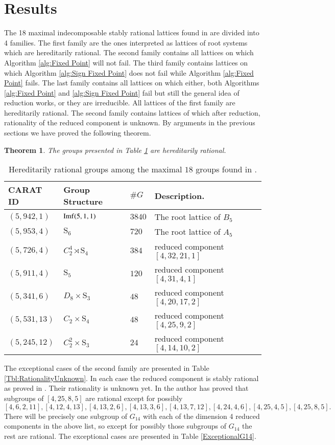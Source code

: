 \documentclass[12pt]{article}
\theoremstyle{plain}
\newtheorem{theorem}{Theorem}
\theoremstyle{definition}
\begin{document}
\section{Results}\label{sec:results}
The 18 maximal indecomposable stably rational lattices found in \cite{Hoshi} are divided into 4 families. The first family are the ones interpreted as lattices of root systems which are hereditarily rational. The second family contains all lattices on which Algorithm \ref{alg:Fixed Point} will not fail. The third family contains lattices on which  Algorithm \ref{alg:Sign Fixed Point} does not fail while Algorithm \ref{alg:Fixed Point} fails. The last family contains all lattices on which either, both Algorithms \ref{alg:Fixed Point} and \ref{alg:Sign Fixed Point} fail but still the general idea of reduction works, or they are irreducible.
All lattices of the first family are hereditarily rational. The second family contains lattices of which after reduction, rationality of the reduced component is unknown. By arguments in the previous sections we have proved the following theorem.
\begin{theorem}
The groups presented in Table \ref{Tbl:Rational} are hereditarily rational.
\end{theorem}
 \begin{table}  
\centering
\begin{tabular}{lllll}
CARAT ID & Group Structure & $\#G$ & Description.\\\hline
$(5,942,1)$ & ${\rm Imf}(5,1,1)$ & $3840$ & The root lattice of $B_5$ \\
 $(5,953,4)$ & $\mathrm{S}_6$ & $720$ &  The root lattice of $A_5$ \\
 $(5,726,4)$ & $C_2^4\rtimes \mathrm{S}_4$ & $384$   & reduced component $[4,32,21,1]$  \\
$(5,911,4)$ & $\mathrm{S}_5$ & $120$  & reduced component $[ 4, 31, 4, 1 ]$  \\
 $(5,341,6)$ & $D_8\times \mathrm{S}_3$ & $48$  & reduced component $[ 4, 20, 17, 2 ]$ &\\
 $(5,531,13)$ & $C_2\times \mathrm{S}_4$ & $48$  & reduced component $[ 4, 25, 9, 2 ]$ &\\
 $(5,245,12)$ & $C_2^2\times \mathrm{S}_3$ & $24$ &reduced component $[ 4, 14, 10, 2 ]$&
\end{tabular}
\caption{Hereditarily rational groups among the maximal $18$ groups 
found in \cite{Hoshi}.}
\label{Tbl:Rational}
\end{table}
\noindent
The exceptional cases of the second family are presented in Table \ref{Tbl:RationalityUnknown}. In each case the reduced component is stably rational as proved in \cite{Hoshi}. Their rationality is unknown yet. In \cite{Nicole1} the author has proved that subgroups of $[ 4, 25, 8, 5 ]$ are rational except for possibly $$[4, 6, 2, 11], [4, 12, 4, 13], [4, 13, 2, 6], [4, 13, 3, 6], [4, 13, 7, 12], [4, 24, 4, 6], [4, 25, 4, 5], [4, 25, 8, 5].$$
There will be precisely one subgroup of $G_{14}$ with each of the dimension 4 reduced components in the above list, so except for possibly those subgroups of $G_{14}$ the rest are rational. The exceptional cases are presented in Table \ref{ExceptionalG14}.
\end{document}
